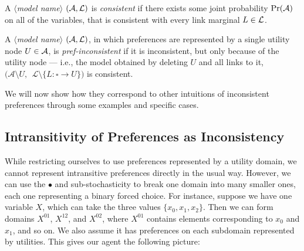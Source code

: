 \documentclass{article}
\newcommand\modelname{{\color{blue!50!black}$\langle$\itshape model name$\rangle$ }}
\begin{document}
	\begin{defn}[consistency]
		A \modelname $(\cal A, L)$ is \emph{consistent} if there exists some joint probability $\Pr(\cal A)$ on all of the variables, that is consistent with every link marginal $L \in \cal L$.
	\end{defn}


	\begin{defn}
		A \modelname $(\cal A, L)$, in which preferences are represented by a single utility node $U \in \cal A$, is \textit{pref-inconsistent} if it is inconsistent, but only because of the utility node --- i.e., the model obtained by deleting $U$ and all links to it, $\big(\mathcal A \setminus U,~~\mathcal L \setminus \{ L : \square\to U \}\big)$ is consistent.
	\end{defn}

	We will now show how they correspond to other intuitions of inconsistent preferences through some examples and specific cases.
	
	\subsection{Intransitivity of Preferences as Inconsistency}
	

	
	While restricting ourselves to use preferences represented by a utility domain, we cannot represent intransitive preferences directly in the usual way. However, we can use the $\bullet$ and sub-stochasticity to break one domain into many smaller ones, each one representing a binary forced choice. For instance, suppose we have one variable $X$, which can take the three values $\{x_0, x_1, x_2\}$. Then we can form domains $X^{01}$, $X^{12}$, and $X^{02}$, where $X^{01}$ contains elements corresponding to $x_0$ and $x_1$, and so on. We also assume it has preferences on each subdomain represented by utilities. This gives our agent the following picture:
	
	\begin{center}
	\end{center}
	
\end{document}
